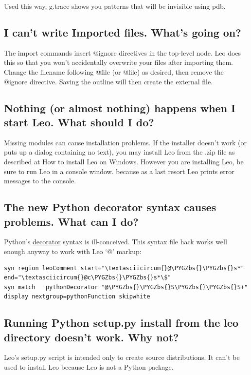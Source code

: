 \documentclass[a4paper,10pt,english]{sphinxmanual}
\def\PYGZbs{\char`\\}
\begin{document}
Used this way, g.trace shows you patterns that will be invisible using pdb.


\subsection{I can't write Imported files.  What's going on?}
\label{FAQ:i-can-t-write-imported-files-what-s-going-on}
The import commands insert @ignore directives in the top-level node.
Leo does this so that you won't accidentally overwrite your files after importing them.
Change the filename following @file (or @file) as desired,
then remove the @ignore directive.
Saving the outline will then create the external file.


\subsection{Nothing (or almost nothing) happens when I start Leo.  What should I do?}
\label{FAQ:id1}
Missing modules can cause installation problems.
If the installer doesn't work (or puts up a dialog containing no text), you may install Leo from the .zip file
as described at How to install Leo on Windows.
However you are installing Leo,
be sure to run Leo in a console window.
because as a last resort Leo prints error messages to the console.


\subsection{The new Python decorator syntax causes problems.  What can I do?}
\label{FAQ:the-new-python-decorator-syntax-causes-problems-what-can-i-do}
Python's \href{http://www.python.org/peps/pep-0318.html}{decorator} syntax is ill-conceived.
This syntax file hack works well enough anyway to work with Leo `@' markup:

\begin{Verbatim}[commandchars=\\\{\}]
syn region leoComment start="\textasciicircum{}@\PYGZbs{}\PYGZbs{}s*" end="\textasciicircum{}@c\PYGZbs{}\PYGZbs{}s*\$"
syn match   pythonDecorator "@\PYGZbs{}\PYGZbs{}S\PYGZbs{}\PYGZbs{}S+" display nextgroup=pythonFunction skipwhite
\end{Verbatim}


\subsection{Running Python setup.py install from the leo directory doesn't work.  Why not?}
\label{FAQ:id2}
Leo's setup.py script is intended only to create source distributions. It can't
be used to install Leo because Leo is not a Python package.
\end{document}
